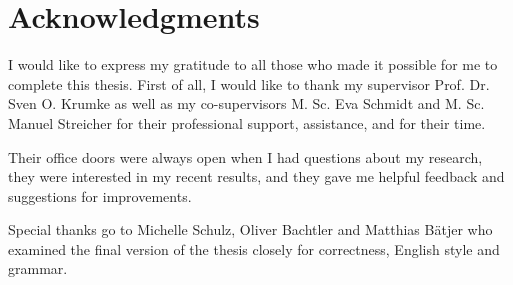 \thispagestyle{empty}
\section*{Acknowledgments}
\label{sec:acknowledge}

I would like to express my gratitude to all those who made it possible for me to complete this thesis. First of all, I would like to thank my supervisor Prof. Dr. Sven O. Krumke as well as my co-supervisors M. Sc. Eva Schmidt and M. Sc. Manuel Streicher for their professional support, assistance, and for their time.\medskip

Their office doors were always open when I had questions about my research, they were interested in my recent results, and they gave me helpful feedback and suggestions for improvements.\medskip

Special thanks go to Michelle Schulz, Oliver Bachtler and Matthias Bätjer who examined the final version of the thesis closely for correctness, English style and grammar.